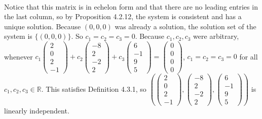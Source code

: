 \documentclass[12pt]{article}
\newenvironment{problem}[2][Problem]
{
	\begin{trivlist} 
		\item[\hskip \labelsep {\bfseries #1 #2:}]
	}
{
	\end{trivlist}
	}
\begin{document}
\begin{problem}{5}
\begin{align*}
\end{align*}
Notice that this matrix is in echelon form and that there are no leading entries in the last column, so by Proposition 4.2.12, the system is consistent and has a unique solution. Because $(0,0,0)$ was already a solution, the solution set of the system is $\{ (0,0,0)\}$. So $c_1=c_2=c_3=0$. Because $c_1,c_2,c_3$ were arbitrary, whenever $c_1 \begin{pmatrix} 2\\0\\2\\-1 \end{pmatrix} + c_2 \begin{pmatrix} -8\\2\\-2\\2 \end{pmatrix}+ c_3 \begin{pmatrix} 6\\-1\\9\\5 \end{pmatrix} = \begin{pmatrix}0\\0\\0\\0\end{pmatrix}$, $c_1=c_2=c_3=0$ for all $c_1,c_2,c_3 \in \mathbb{R}$. This satisfies Definition 4.3.1, so $\left( \begin{pmatrix} 2\\0\\2\\-1 \end{pmatrix}, \begin{pmatrix} -8\\2\\-2\\2 \end{pmatrix}, \begin{pmatrix} 6\\-1\\9\\5 \end{pmatrix} \right)$ is linearly independent.


\end{problem}
\end{document}
